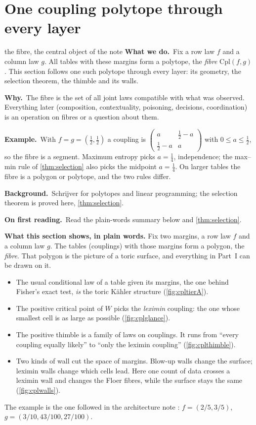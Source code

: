 \documentclass[11pt]{article}
\theoremstyle{definition}\newtheorem{definition}[theorem]{Definition}\newtheorem{remark}[theorem]{Remark}\newtheorem{example}[theorem]{Example}\newtheorem{problem}[theorem]{Open problem}\crefname{problem}{Problem}{Problems}
\newcommand{\rbwhat}{\textcolor{rbWhat}{\textbf{What we do.}}~}\newcommand{\rbwhy}{\par\smallskip\textcolor{rbWhy}{\textbf{Why.}}~}
\newcommand{\rbex}{\par\smallskip\textcolor{rbEx}{\textbf{Example.}}~}\newcommand{\rbbg}{\par\smallskip\textcolor{rbBg}{\textbf{Background.}}~}
\newcommand{\rbfirst}{\par\smallskip\textcolor{rbFirst}{\textbf{On first reading.}}~}
\begin{document}
\section{One coupling polytope through every layer}\label{sec:fibre}
\begin{readerbox}{the fibre, the central object of the note}
\rbwhat Fix a row law $f$ and a column law $g$. All tables with these margins form a polytope, the \emph{fibre} $\mathrm{Cpl}(f,g)$. This section follows one such polytope through every layer: its geometry, the selection theorem, the thimble and its walls.
\rbwhy The fibre is the set of all joint laws compatible with what was observed. Everything later (composition, contextuality, poisoning, decisions, coordination) is an operation on fibres or a question about them.
\rbex With $f=g=(\tfrac12,\tfrac12)$ a coupling is $\begin{pmatrix}a&\tfrac12-a\\ \tfrac12-a&a\end{pmatrix}$ with $0\le a\le\tfrac12$, so the fibre is a segment. Maximum entropy picks $a=\tfrac14$, independence; the max--min rule of \cref{thm:selection} also picks the midpoint $a=\tfrac14$. On larger tables the fibre is a polygon or polytope, and the two rules differ.
\rbbg Schrijver \cite{Schrijver1986} for polytopes and linear programming; the selection theorem is proved here, \cref{thm:selection}.
\rbfirst Read the plain-words summary below and \cref{thm:selection}.
\end{readerbox}
\begin{center}\colorbox{stAdapted!60}{\begin{minipage}{0.94\linewidth}\small
\textbf{What this section shows, in plain words.} Fix two margins, a row law $f$ and a column law $g$. The tables (couplings) with those margins form a
polygon, the \emph{fibre}. That polygon is the picture of a toric surface, and everything in Part~I can be drawn on it.
\begin{itemize}[leftmargin=1.4em,itemsep=1pt]
\item The usual conditional law of a table given its margins, the one behind Fisher's exact test, \emph{is} the toric K\"ahler structure (\cref{fig:cpltierA}).
\item The positive critical point of $W$ picks the \emph{leximin} coupling: the one whose smallest cell is as large as possible (\cref{fig:cplglance}).
\item The positive thimble is a family of laws on couplings. It runs from ``every coupling equally likely'' to ``only the leximin coupling'' (\cref{fig:cplthimble}).
\item Two kinds of wall cut the space of margins. Blow-up walls change the surface; leximin walls change which cells lead. Here one count of
  data crosses a leximin wall and changes the Floer fibres, while the surface stays the same (\cref{fig:cplwalls}).
\end{itemize}
The example is the one followed in the architecture note \cite{Awasthi2026Arch}: $f=(2/5,3/5)$, $g=(3/10,43/100,27/100)$.
\end{minipage}}\end{center}
\end{document}
